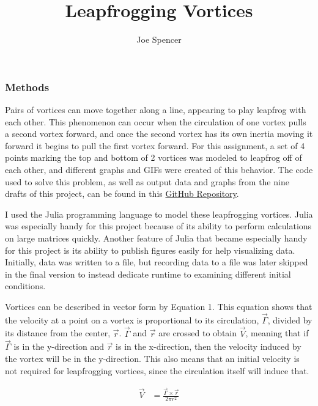 \documentclass{article}
\begin{document}
\author{Joe Spencer}
\title{Leapfrogging Vortices}
\date{}  %
\maketitle

\subsubsection*{Methods}
Pairs of vortices can move together along a line, appearing to play leapfrog with each other. This phenomenon can occur when the circulation of one vortex pulls a second vortex forward, and once the second vortex has its own inertia moving it forward it begins to pull the first vortex forward. For this assignment, a set of 4 points marking the top and bottom of 2 vortices was modeled to leapfrog off of each other, and different graphs and GIFs were created of this behavior. The code used to solve this problem, as well as output data and graphs from the nine drafts of this project, can be found in this \href{https://github.com/JoeSpencer1/LeapFrog1}{GitHub Repository}. \newline

I used the Julia programming language to model these leapfrogging vortices. Julia was especially handy for this project because of its ability to perform calculations on large matrices quickly. Another feature of Julia that became especially handy for this project is its ability to publish figures easily for help visualizing data. Initially, data was written to a file, but recording data to a file was later skipped in the final version to instead dedicate runtime to examining different initial conditions.\newline

Vortices can be described in vector form by Equation 1. This equation shows that the velocity at a point on a vortex is proportional to its circulation, $\vec{\Gamma}$, divided by its distance from the center, $\vec{r}$. $\vec{\Gamma}$ and $\vec{r}$ are crossed to obtain $\vec{V}$, meaning that if $\vec{\Gamma}$ is in the y-direction and $\vec{r}$ is in the x-direction, then the velocity induced by the vortex will be in the y-direction. This also means that an initial velocity is not required for leapfrogging vortices, since the circulation itself will induce that. 

\begin{equation}
    \begin{aligned}
        \vec{V} &= \frac{\vec{\Gamma} \times \vec{r}}{2 \pi r^2}
    \end{aligned}
\end{equation}
\end{document}
